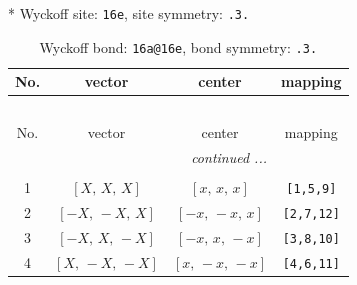 \documentclass[fleqn,8pt]{jsarticle}
\begin{document}
* Wyckoff site: {\tt 16e}, site symmetry: {\tt .3.}
\renewcommand{\arraystretch}{1.2}
\begin{longtable}{cccc}
\caption{Wyckoff bond: {\tt 16a@16e}, bond symmetry: {\tt .3.}}
 \\
 \hline \hline
No. & vector & center & mapping \\ \hline \endfirsthead

\multicolumn{3}{l}{\tablename\ \thetable{}} \\
 \hline \hline
No. & vector & center & mapping \\ \hline \endhead

 \hline \hline
\multicolumn{3}{r}{\footnotesize\it continued ...} \\ \endfoot

 \hline \hline
\multicolumn{3}{r}{} \\ \endlastfoot

1 & $\left[ X,\, X,\, X \right]$ & $\left[ x,\, x,\, x \right]$ & {\tt [1,5,9]} \\ \hline
2 & $\left[ - X,\, - X,\, X \right]$ & $\left[ - x,\, - x,\, x \right]$ & {\tt [2,7,12]} \\ \hline
3 & $\left[ - X,\, X,\, - X \right]$ & $\left[ - x,\, x,\, - x \right]$ & {\tt [3,8,10]} \\ \hline
4 & $\left[ X,\, - X,\, - X \right]$ & $\left[ x,\, - x,\, - x \right]$ & {\tt [4,6,11]} \\
\end{longtable}
\renewcommand{\arraystretch}{1.2}
\end{document}

